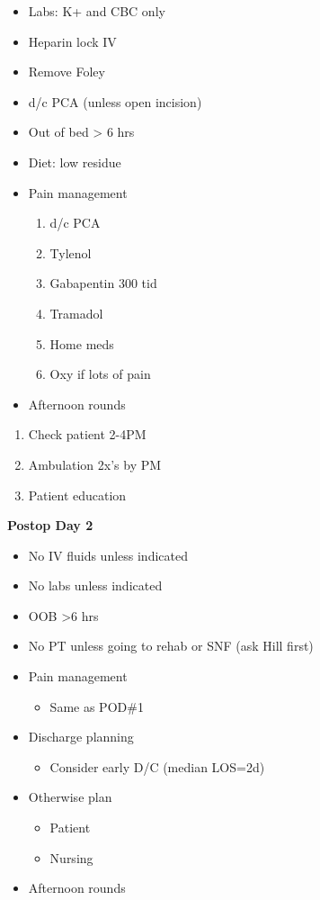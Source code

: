 \documentclass[
]{book}
\providecommand{\tightlist}{%
  \setlength{\itemsep}{0pt}\setlength{\parskip}{0pt}}
\begin{document}
\begin{itemize}
\tightlist
\item
  Labs: K+ and CBC only
\item
  Heparin lock IV
\item
  Remove Foley
\item
  d/c PCA (unless open incision)
\item
  Out of bed \textgreater{} 6 hrs
\item
  Diet: low residue
\item
  Pain management

  \begin{enumerate}
  \def\labelenumi{\arabic{enumi})}
  \tightlist
  \item
    d/c PCA
  \item
    Tylenol
  \item
    Gabapentin 300 tid
  \item
    Tramadol
  \item
    Home meds
  \item
    Oxy if lots of pain
  \end{enumerate}
\item
  Afternoon rounds
\end{itemize}

\begin{enumerate}
\def\labelenumi{\arabic{enumi})}
\tightlist
\item
  Check patient 2-4PM
\item
  Ambulation 2x's by PM
\item
  Patient education
\end{enumerate}

\textbf{Postop Day 2}

\begin{itemize}
\tightlist
\item
  No IV fluids unless indicated
\item
  No labs unless indicated
\item
  OOB \textgreater6 hrs
\item
  No PT unless going to rehab or SNF (ask Hill first)
\item
  Pain management

  \begin{itemize}
  \tightlist
  \item
    Same as POD\#1
  \end{itemize}
\item
  Discharge planning

  \begin{itemize}
  \tightlist
  \item
    Consider early D/C (median LOS=2d)
  \end{itemize}
\item
  Otherwise plan

  \begin{itemize}
  \tightlist
  \item
    Patient
  \item
    Nursing
  \end{itemize}
\item
  Afternoon rounds
\end{itemize}
\end{document}
